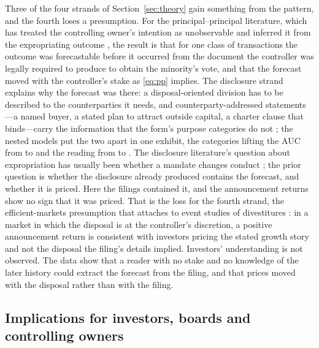 Three of the four strands of Section~\ref{sec:theory} gain something from the pattern, and the fourth loses a presumption. For the principal--principal literature, which has treated the controlling owner's intention as unobservable and inferred it from the expropriating outcome \cite{bertrand2002, bae2002, baek2006, buchuk2014, chen2024}, the result is that for one class of transactions the outcome was forecastable before it occurred from the document the controller was legally required to produce to obtain the minority's vote, and that the forecast moved with the controller's stake as \eqref{eq:pp} implies. The disclosure strand explains why the forecast was there: a disposal-oriented division has to be described to the counterparties it needs, and counterparty-addressed statements---a named buyer, a stated plan to attract outside capital, a charter clause that binds---carry the information that the form's purpose categories do not \cite{crawford1982, farrell1996, jensen1976}; the nested models put the two apart in one exhibit, the categories lifting the AUC from \NestedMZero{} to \NestedMOne{} and the reading from \NestedMTwo{} to \NestedMThree{}. The disclosure literature's question about expropriation has usually been whether a mandate changes conduct \cite{benshahar2014}; the prior question is whether the disclosure already produced contains the forecast, and whether it is priced. Here the filings contained it, and the announcement returns show no sign that it was priced. That is the loss for the fourth strand, the efficient-markets presumption that attaches to event studies of divestitures \cite{schipper1986, nanda1991, slovin1995, hulburt2002}: in a market in which the disposal is at the controller's discretion, a positive announcement return is consistent with investors pricing the stated growth story and not the disposal the filing's details implied. Investors' understanding is not observed. The data show that a reader with no stake and no knowledge of the later history could extract the forecast from the filing, and that prices moved with the disposal rather than with the filing.

\subsection{Implications for investors, boards and controlling owners}\label{sec:practitioner}

